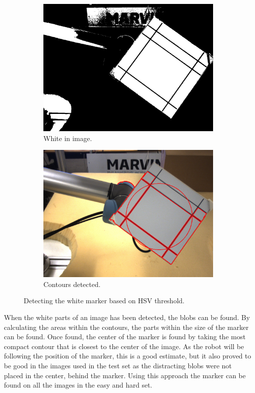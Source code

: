 \begin{figure}[H]
 \centering
 \begin{subfigure}{\exampleWidth}
 \includegraphics[width=\linewidth]{graphics/hsv_white}
 \caption{White in image.}
 \end{subfigure}
 \begin{subfigure}{\exampleWidth}
 \includegraphics[width=\linewidth]{graphics/hsv_white_contours}
 \caption{Contours detected.}
 \end{subfigure}
 \caption{Detecting the white marker based on HSV threshold.}
 \label{fig:hsv_marker1}
\end{figure}

When the white parts of an image has been detected, the blobs can be found.
By calculating the areas within the contours, the parts within the size of the marker can be found.
Once found, the center of the marker is found by taking the most compact contour that is closest to the center of the image.
As the robot will be following the position of the marker, this is a good estimate, but it also proved to be good in the images used in the test set as the distracting blobs were not placed in the center, behind the marker.
Using this approach the marker can be found on all the images in the easy and hard set.

